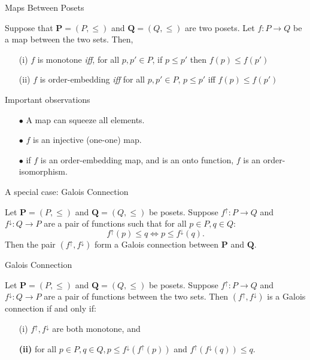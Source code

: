 \documentclass[pdf,xcolor=table]{beamer}
\begin{document}
\begin{frame}[t]{Maps Between Posets}
    \begin{definition}
         Suppose that $\textbf{P} = (P, \leq)$ and $\textbf{Q} = (Q, \leq)$ are two posets. Let $f: P \rightarrow Q$ be a map between the two sets. Then,
        \begin{enumerate}
            \item[(i)]$f$ is monotone \textit{iff}, for all $p, p' \in P$, if $p \leq p'$ then $f(p) \leq f(p')$
            \item[(ii)] $f$ is order-embedding \textit{iff} for all $p, p' \in P$, $p \leq p'$ iff $f(p) \leq f(p')$
        \end{enumerate}
    \end{definition}
    Important observations
    \begin{itemize}
        \item[$\bullet$] A map can squeeze all elements.
        \item[$\bullet$] $f$ is an injective (one-one) map.
        \item[$\bullet$] if $f$ is an order-embedding map, and is an onto function, $f$ is an order-isomorphism.
    \end{itemize}
\end{frame}

\begin{frame}[t]{A special case: Galois Connection}
    \begin{definition}
        Let $\textbf{P} = (P, \leq)$ and $\textbf{Q} = (Q, \leq)$ be posets.
        Suppose $f^{\uparrow}: P \rightarrow Q$ and $f^{\downarrow}: Q \rightarrow P$ are a pair of functions such that for all $p \in P, q \in Q:$
            \begin{equation}
                f^{\uparrow}(p) \leq q \iff p \leq f^{\downarrow}(q).
            \end{equation}
        Then the pair $(f^\uparrow, f^\downarrow)$ form a Galois connection between $\textbf{P}$ and $\textbf{Q}$.
    \end{definition}
\end{frame}

\begin{frame}[t]{Galois Connection}
    \begin{theorem}
        Let $\textbf{P} = (P, \leq)$ and $\textbf{Q} = (Q, \leq)$ be posets.
        Suppose $f^{\uparrow}: P \rightarrow Q$ and $f^{\downarrow}: Q \rightarrow P$ are a pair of functions between the two sets. Then $(f^\uparrow, f^\downarrow)$ is a Galois connection if and only if:
        \begin{itemize}
            \item[(i)] $f^\uparrow, f^\downarrow$ are both monotone, and
            \item[\textbf{(ii)}] for all $p \in P, q \in Q, p\leq f^\downarrow(f^\uparrow(p))$ and $f^\uparrow(f^\downarrow(q)) \leq q$.
        \end{itemize}
    \end{theorem}
\end{frame}
\end{document}
